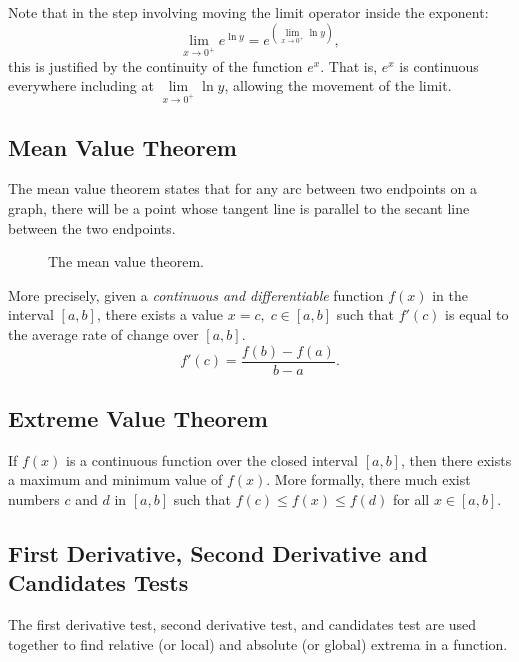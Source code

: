 \documentclass[12pt]{article}
\begin{document}
\noindent Note that in the step involving moving the limit operator inside the exponent:
\[ \lim_{x \to 0^+} e^{\ln y} = e^{\left( \lim \limits_{x \to 0^+} \ln y \right)}, \]
this is justified by the continuity of the function $e^x$. That is, $e^x$ is continuous everywhere including at $\lim \limits_{x \to 0^+} \ln y$, allowing the movement of the limit.

\subsection{Mean Value Theorem}
The mean value theorem states that for any arc between two endpoints on a graph, there will be a point whose tangent line is parallel to the secant line between the two endpoints.

\begin{figure}[H]
	\centering
	\caption{The mean value theorem.}
	\label{fig:mean_value_theorem}
\end{figure}

More precisely, given a \textit{continuous and differentiable} function $f(x)$ in the interval $[a, b]$, there exists a value $x = c, \; c \in [a, b]$ such that $f'(c)$ is equal to the average rate of change over $[a, b]$.
\[ f'(c) = \frac{f(b) - f(a)}{b - a}. \]

\subsection{Extreme Value Theorem}
If $f(x)$ is a continuous function over the closed interval $[a, b]$, then there exists a maximum and minimum value of $f(x)$. More formally, there much exist numbers $c$ and $d$ in $[a, b]$ such that $f(c) \leq f(x) \leq f(d)$ for all $x \in [a, b]$.

\subsection{First Derivative, Second Derivative and Candidates Tests}
The first derivative test, second derivative test, and candidates test are used together to find relative (or local) and absolute (or global) extrema in a function.
\end{document}

